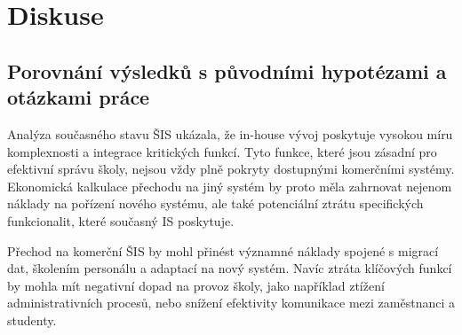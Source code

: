 \documentclass[FM,Proj]{tulthesis}
\begin{document}


\chapter{Diskuse}
\section{Porovnání výsledků s původními hypotézami a otázkami práce}
Analýza současného stavu ŠIS ukázala, že in-house vývoj poskytuje vysokou míru 
komplexnosti a integrace kritických funkcí. Tyto funkce, které jsou zásadní pro 
efektivní správu školy, nejsou vždy plně pokryty dostupnými komerčními systémy.
Ekonomická kalkulace přechodu na jiný systém by proto měla zahrnovat nejenom náklady 
na pořízení nového systému, ale také potenciální ztrátu specifických funkcionalit,
které současný IS poskytuje.

Přechod na komerční ŠIS by mohl přinést významné náklady spojené s migrací dat,
školením personálu a adaptací na nový systém. Navíc ztráta klíčových funkcí
by mohla mít negativní dopad na provoz školy, jako například ztížení administrativních
procesů, nebo snížení efektivity komunikace mezi zaměstnanci a studenty.
\end{document}

